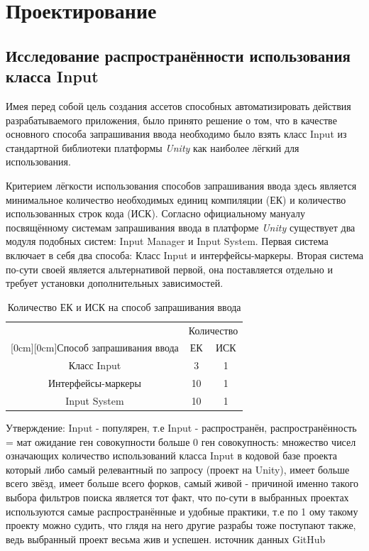 \chapter{Проектирование}
\label{cha:ch_1}

\section{Исследование распространённости использования класса Input}
Имея перед собой цель создания ассетов способных автоматизировать действия разрабатываемого приложения, было принято решение о том, что в качестве основного способа запрашивания ввода необходимо было взять класс Input из стандартной библиотеки платформы \textit{Unity} как наиболее лёгкий для использования.

Критерием лёгкости использования способов запрашивания ввода здесь является минимальное количество необходимых единиц компиляции (ЕК) и количество использованных строк кода (ИСК). Согласно официальному мануалу посвящённому системам запрашивания ввода \cite{unity_input_systems} в платформе \textit{Unity} существует два модуля подобных систем: Input Manager и Input System. Первая система включает в себя два способа: Класс Input и интерфейсы-маркеры. Вторая система по-сути своей является альтернативой первой, она поставляется отдельно и требует установки дополнительных зависимостей.

\begin{table}[H]
	\caption{\label{tab:bolts}Количество ЕК и ИСК на способ запрашивания ввода}
	\begin{center}
		\begin{tabular}{|c|c|c|}
			\hline
			& \multicolumn{2}{c|}{Количество} \\
			\cline{2-3}
			\raisebox{1.5ex}[0cm][0cm]{Способ запрашивания ввода}
			& ЕК & ИСК \\
			\hline
			Класс Input & 3 & 1 \\
			\hline
			Интерфейсы-маркеры & 10 & 1 \\
			\hline
			Input System & 10 & 1 \\
			\hline
		\end{tabular}
	\end{center}
\end{table}

Утверждение: Input - популярен, т.е Input - распространён,
распространённость = мат ожидание ген совокупности больше 0
ген совокупность: множество чисел означающих количество использований класса Input в кодовой базе проекта который либо самый релевантный по запросу (проект на Unity), имеет больше всего звёзд, имеет больше всего форков, самый живой - причиной именно такого выбора фильтров поиска является тот факт, что по-сути в выбранных проектах используются самые распространённые и удобные практики, т.е по 1 ому такому проекту можно судить, что глядя на него другие разрабы тоже поступают также, ведь выбранный проект весьма жив и успешен.
источник данных GitHub

